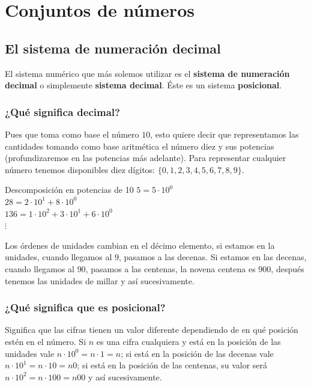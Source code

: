 \chapter{Conjuntos de números}

\section{El sistema de numeración decimal}

El sistema numérico que más solemos utilizar es el \textbf{sistema de numeración decimal} o simplemente \textbf{sistema decimal}. Éste es un sistema \textbf{posicional}. 

\subsection{¿Qué significa decimal?}

Pues que toma como base el número $10$, esto quiere decir que representamos las cantidades tomando como base aritmética el número diez y sus potencias (profundizaremos en las potencias más adelante). Para representar cualquier número tenemos disponibles diez dígitos: $\{0, 1, 2, 3, 4, 5, 6, 7, 8, 9\}$.

\begin{ejemplos}[label={Ejemplo:descomposicionPotencias10}]{Descomposición en potencias de 10}
    $5 = 5 \cdot 10^0$ \\
    $28 = 2 \cdot 10^1 + 8 \cdot 10^0$ \\
    $136 = 1 \cdot 10^2 + 3 \cdot 10^1 + 6 \cdot 10^0$ \\
    $\vdots$
\end{ejemplos}

Los órdenes de unidades cambian en el décimo elemento, si estamos en la unidades, cuando llegamos al $9$, pasamos a las decenas. Si estamos en las decenas, cuando llegamos al $90$, pasamos a las centenas, la novena centena es $900$, después tenemos las unidades de millar y así sucesivamente.

\subsection{¿Qué significa que es posicional?}

Significa que las cifras tienen un valor diferente dependiendo de en qué posición estén en el número. Si $n$ es una cifra cualquiera y está en la posición de las unidades vale $n \cdot 10^0 = n \cdot 1 = n$; si está en la posición de las decenas vale $n \cdot 10^1 = n \cdot 10 = n0$; si está en la posición de las centenas, su valor será $n \cdot 10^2 = n \cdot 100 = n00$ y así sucesivamente.

